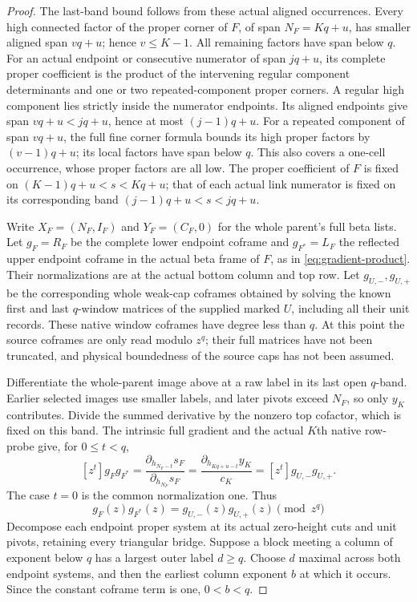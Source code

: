 \documentclass[11pt,a4paper]{amsart}
\numberwithin{equation}{section}
\theoremstyle{plain}
\theoremstyle{definition}
\begin{document}
\begin{proof}
The last-band bound follows from these actual aligned occurrences.
Every high connected factor of the proper corner of \(F\), of span
\(N_F=Kq+u\), has smaller aligned span \(vq+u\); hence \(v\le K-1\).
All remaining factors have span below \(q\).
For an actual endpoint or consecutive numerator of span \(jq+u\), its
complete proper coefficient is the product of the intervening regular
component determinants and one or two repeated-component proper corners.
A regular high component lies strictly inside the numerator endpoints.
Its aligned endpoints give span \(vq+u<jq+u\), hence at most
\((j-1)q+u\).  For a repeated component of span \(vq+u\), the full fine
corner formula bounds its high proper factors by \((v-1)q+u\);
its local factors have span below \(q\).  This also covers a one-cell
occurrence, whose proper factors are all low.  The proper coefficient
of \(F\) is fixed on \((K-1)q+u<s<Kq+u\); that of each actual link
numerator is fixed on its corresponding band \((j-1)q+u<s<jq+u\).

Write \(X_F=(N_F,I_F)\) and \(Y_F=(C_F,0)\) for the whole parent's
full beta lists.
Let \(g_F=R_F\) be the complete lower endpoint coframe and
\(g_{F^*}=L_F\) the reflected upper endpoint coframe in the actual beta
frame of \(F\), as in \eqref{eq:gradient-product}.  Their normalizations
are at the actual bottom column and top row.  Let \(g_{U,-},g_{U,+}\)
be the corresponding whole weak-cap coframes obtained by solving the
known first and last \(q\)-window matrices of the supplied marked \(U\),
including all their unit records.  These native window coframes have
degree less than \(q\).  At this point the source coframes are only read
modulo \(z^q\); their full matrices have not been truncated, and physical
boundedness of the source caps has not been assumed.

Differentiate the whole-parent image above at a raw label in its
last open \(q\)-band.  Earlier selected images use smaller labels,
and later pivots exceed \(N_F\), so only \(y_K\) contributes.
Divide the summed derivative by the nonzero top cofactor, which
is fixed on this band.  The intrinsic full gradient and the actual
\(K\)th native row-probe give,
for \(0\le t<q\),
\[
 [z^t]g_Fg_{F^*}
 =\frac{\partial_{h_{N_F-t}}s_F}{\partial_{h_{N_F}}s_F}
 =\frac{\partial_{h_{Kq+u-t}}y_K}{c_K}
 =[z^t]g_{U,-}g_{U,+}.
\]
The case \(t=0\) is the common normalization one.  Thus
\begin{equation}\label{eq:whole-cap-product}
 g_F(z)g_{F^*}(z)=g_{U,-}(z)g_{U,+}(z)\pmod {z^q}
\end{equation}
Decompose each endpoint proper system at its actual zero-height cuts
and unit pivots, retaining every triangular bridge.
Suppose a block meeting a column of exponent below \(q\) has a
largest outer label \(d\ge q\).  Choose \(d\) maximal across both
endpoint systems, and then the earliest column exponent \(b\) at
which it occurs.  Since the constant coframe term is one,
\(0<b<q\).


\end{proof}
\end{document}
